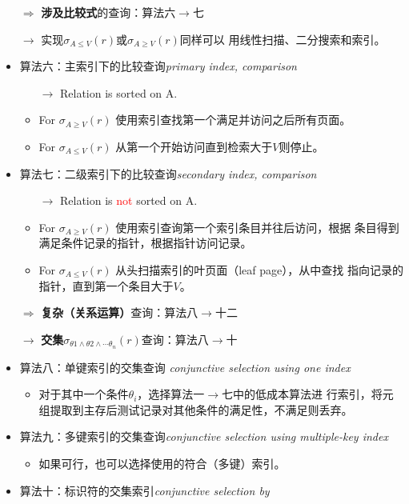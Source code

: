 \documentclass[b5paper, twoside]{article}
\let\oldtextbf\textbf
\renewcommand{\textbf}[1]{\textcolor{myblue}{\oldtextbf{#1}}}
\let\oldemph\emph
\renewcommand{\emph}[1]{\textcolor{mypink}{\oldemph{#1}}}
\newenvironment{smallmdframed}
  {\begin{mdframed}[linewidth=0pt, backgroundcolor=pink!20]\small}
  {\end{mdframed}}
\begin{document}
\begin{itemize}
\begin{smallmdframed}
\end{smallmdframed}
	\item[$\Rightarrow$] \textbf{涉及比较式}的查询：算法六$\rightarrow$七
	\item[$\rightarrow$] 实现$\sigma_{A\leq V}(r)$或$\sigma_{A\geq V}(r)$同样可以
	用线性扫描、二分搜索和索引。
	\item 算法六：主索引下的比较查询\hfill \emph{primary index, comparison}
	\begin{itemize}
		\item[$\rightarrow$] Relation is sorted on A.
		\item For $\sigma_{A\geq V}(r)$ 
		使用索引查找第一个满足并访问之后所有页面。
		\item For $\sigma_{A\leq V}(r)$ 从第一个开始访问直到检索大于$V$则停止。
	\end{itemize}
	\item 算法七：二级索引下的比较查询\hfill \emph{secondary index, comparison}
	\begin{itemize}
		\item[$\rightarrow$] Relation is \textcolor{red}{not} sorted on A.
		\item For $\sigma_{A\geq V}(r)$ 使用索引查询第一个索引条目并往后访问，根据
		条目得到满足条件记录的指针，根据指针访问记录。
		\item For $\sigma_{A\leq V}(r)$ 从头扫描索引的叶页面（leaf page），从中查找
		指向记录的指针，直到第一个条目大于$V$。
	\end{itemize}
	\item[$\Rightarrow$] \textbf{复杂（关系运算）}查询：算法八$\rightarrow$十二
	\item[$\rightarrow$] \textbf{交集}$\sigma_{\theta1 \wedge \theta2 \wedge 
	\cdots \theta_n}(r)$查询：算法八$\rightarrow$十
	\item 算法八：单键索引的交集查询 \hfill \emph{conjunctive selection using one 
	index}
	\begin{itemize}
		\item 对于其中一个条件$\theta_i$，选择算法一$\rightarrow$七中的低成本算法进
		行索引，将元组提取到主存后测试记录对其他条件的满足性，不满足则丢弃。
	\end{itemize}
	\item 算法九：多键索引的交集查询\hfill \emph{conjunctive selection using 
	multiple-key index}
	\begin{itemize}
		\item 如果可行，也可以选择使用的符合（多键）索引。
	\end{itemize}
	\item 算法十：标识符的交集索引\hfill \emph{conjunctive selection by 
}
\end{itemize}
\end{document}
